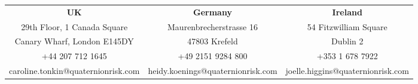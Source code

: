 \documentclass[10pt,German]{beamer}
\begin{document}
\begin{frame}{}

{\tiny
\color{white}
\begin{center}
\hspace{-0.49cm}
\begin{tabular}{ccc}
{\bf UK}                           & {\bf Germany}           &  {\bf Ireland} \\
29th Floor, 1 Canada Square        & Maurenbrecherstrasse 16 & 54 Fitzwilliam Square\\
Canary Wharf, London E145DY        & 47803 Krefeld           & Dublin 2\\
+44 207 712 1645                   & +49 2151 9284 800       & +353 1 678 7922\\
caroline.tonkin@quaternionrisk.com & heidy.koenings@quaternionrisk.com & joelle.higgins@quaternionrisk.com\\
\end{tabular}
\end{center}
}

\end{frame}
\end{document}
